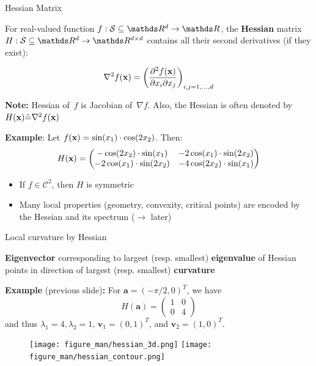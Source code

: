 \documentclass[11pt,compress,t,notes=noshow, xcolor=table]{beamer}
\begin{document}
\begin{vbframe}{Hessian Matrix}

For real-valued function $f:\mathcal{S}\subseteq \R^d \to \R$, the \textbf{Hessian} matrix $H:\mathcal{S}\subseteq \R^d \to \R^{d \times d}$ contains all their second derivatives (if they exist):

\begin{equation*}
\nabla^2 f(\mathbf{x}) = \left(\frac{\partial^2 f(\mathbf{x})}{\partial x_i \partial x_j}\right)_{i,j=1,\ldots,d}
\end{equation*}

\medskip

\textbf{Note:} Hessian of~$f$ is Jacobian of~$\nabla f$. Also, the Hessian is often denoted by $H(\mathbf{x})\hat{=}\nabla^2 f(\mathbf{x})$
\medskip

\textbf{Example}: Let $f(\mathbf{x}) = \sin(x_1) \cdot \cos(2x_2)$.
Then:
\begin{equation*}
    H(\mathbf{x}) = \begin{pmatrix}
        -\cos(2x_2)\cdot\sin(x_1) & -2\cos(x_1)\cdot\sin(2x_2) \\
        -2\cos(x_1)\cdot\sin(2x_2) & -4\cos(2x_2)\cdot\sin(x_1)
    \end{pmatrix}
\end{equation*}

\begin{itemize}
    \item If $f\in\mathcal{C}^2$, then $H$ is symmetric
    \item Many local properties (geometry, convexity, critical points) are encoded by the Hessian and its spectrum ($\rightarrow$ later)
\end{itemize}

\end{vbframe}


\begin{vbframe}{Local curvature by Hessian}

\textbf{Eigenvector} corresponding to largest (resp. smallest) \textbf{eigenvalue} of Hessian points in direction of largest (resp. smallest) \textbf{curvature}

\lz

\textbf{Example} (previous slide)\textbf{:}
For $\bm{a}=(-\pi/2,0)^T$, we have
\begin{equation*}
    H(\bm{a}) = \begin{pmatrix}
        1 & 0 \\ 0 & 4
    \end{pmatrix}
\end{equation*}
and thus $\lambda_{1}=4, \lambda_{2}=1$, $\bm{v}_{1}=(0, 1)^T$, and $\bm{v}_{2}=(1, 0)^T$.

\begin{figure}
    \texttt{[image: figure\_man/hessian\_3d.png]}
    \hspace{0.5cm}
    \texttt{[image: figure\_man/hessian\_contour.png]}
\end{figure}

\end{vbframe}
\end{document}
